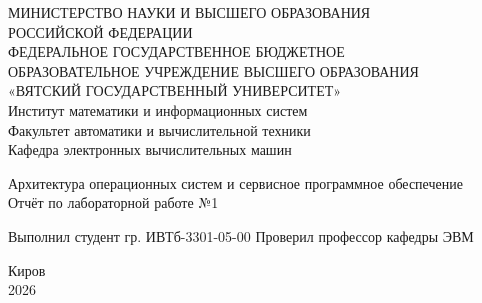 \documentclass[oneside,a4paper,14pt]{extarticle}
\begin{document}
\newpage\thispagestyle{empty}
\begin{center}
	МИНИСТЕРСТВО НАУКИ И ВЫСШЕГО ОБРАЗОВАНИЯ\\
	РОССИЙСКОЙ ФЕДЕРАЦИИ\\
	ФЕДЕРАЛЬНОЕ ГОСУДАРСТВЕННОЕ БЮДЖЕТНОЕ\\
	ОБРАЗОВАТЕЛЬНОЕ УЧРЕЖДЕНИЕ ВЫСШЕГО ОБРАЗОВАНИЯ\\
	«ВЯТСКИЙ ГОСУДАРСТВЕННЫЙ УНИВЕРСИТЕТ»\\
	Институт математики и информационных систем\\
	Факультет автоматики и вычислительной техники\\
	Кафедра электронных вычислительных машин
\end{center}
\vspace{20mm}
\begin{center}
	Архитектура операционных систем и сервисное программное обеспечение\\
	Отчёт по лабораторной работе №1\\
\end{center}
\vfill
Выполнил студент гр. ИВТб-3301-05-00 \hfill
{}
Проверил профессор кафедры ЭВМ\hfill
{}
\vfill
\begin{center}
	Киров\\
	2026
\end{center}
\end{document}
